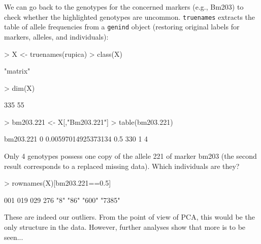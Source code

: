 \documentclass{article}
\begin{document}
\noindent We can go back to the genotypes for the concerned markers (e.g.,
Bm203) to check whether the highlighted genotypes are uncommon.
\texttt{truenames} extracts the table of allele frequencies from a
\texttt{genind} object (restoring original labels for markers, alleles, and individuals):
\begin{Schunk}
\begin{Sinput}
> X <- truenames(rupica)
> class(X)
\end{Sinput}
\begin{Soutput}
[1] "matrix"
\end{Soutput}
\begin{Sinput}
> dim(X)
\end{Sinput}
\begin{Soutput}
[1] 335  55
\end{Soutput}
\begin{Sinput}
> bm203.221 <- X[,"Bm203.221"]
> table(bm203.221)
\end{Sinput}
\begin{Soutput}
bm203.221
                  0 0.00597014925373134                 0.5 
                330                   1                   4 
\end{Soutput}
\end{Schunk}
Only 4 genotypes possess one copy of the allele 221 of marker bm203 (the second result
corresponds to a replaced missing data).
Which individuals are they?
\begin{Schunk}
\begin{Sinput}
> rownames(X)[bm203.221==0.5]
\end{Sinput}
\begin{Soutput}
   001    019    029    276 
   "8"   "86"  "600" "7385" 
\end{Soutput}
\end{Schunk}
These are indeed our outliers.
From the point of view of PCA, this would be the only structure in the data.
However, further analyses show that more is to be seen...
\\






\end{document}
